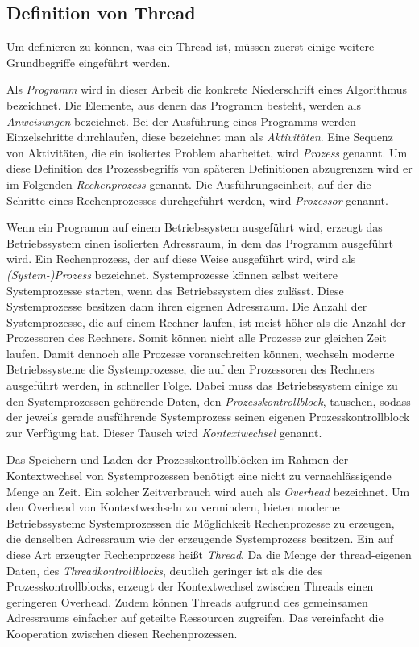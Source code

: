 

\subsection{Definition von Thread}
Um definieren zu können, was ein Thread ist, müssen zuerst einige weitere Grundbegriffe eingeführt werden. 

Als \emph{Programm} wird in dieser Arbeit die konkrete Niederschrift eines Algorithmus bezeichnet. Die Elemente, aus denen das Programm besteht, werden als \emph{Anweisungen} bezeichnet. Bei der Ausführung eines Programms werden Einzelschritte durchlaufen, diese bezeichnet man als \emph{Aktivitäten}. Eine Sequenz von Aktivitäten, die ein isoliertes Problem abarbeitet, wird \emph{Prozess} genannt. Um diese Definition des Prozessbegriffs von späteren Definitionen abzugrenzen wird er im Folgenden \emph{Rechenprozess} genannt. Die Ausführungseinheit, auf der die Schritte eines Rechenprozesses durchgeführt werden, wird \emph{Prozessor} genannt.\cite{Herrtwich1989}

Wenn ein Programm auf einem Betriebssystem ausgeführt wird, erzeugt das Betriebssystem einen isolierten Adressraum, in dem das Programm ausgeführt wird. Ein Rechenprozess, der auf diese Weise ausgeführt wird, wird als \emph{(System-)Prozess} bezeichnet. Systemprozesse können selbst weitere Systemprozesse starten, wenn das Betriebssystem dies zulässt. Diese Systemprozesse besitzen dann ihren eigenen Adressraum. Die Anzahl der Systemprozesse, die auf einem Rechner laufen, ist meist höher als die Anzahl der Prozessoren des Rechners. Somit können nicht alle Prozesse zur gleichen Zeit laufen. Damit dennoch alle Prozesse voranschreiten können, wechseln moderne Betriebssysteme die Systemprozesse, die auf den Prozessoren des Rechners ausgeführt werden, in schneller Folge. Dabei muss das Betriebssystem einige zu den Systemprozessen gehörende Daten, den \emph{Prozesskontrollblock}, tauschen, sodass der jeweils gerade ausführende Systemprozess seinen eigenen Prozesskontrollblock zur Verfügung hat. Dieser Tausch wird \emph{Kontextwechsel} genannt.\cite{Jobst2018}

Das Speichern und Laden der Prozesskontrollblöcken im Rahmen der Kontextwechsel von Systemprozessen benötigt eine nicht zu vernachlässigende Menge an Zeit. Ein solcher Zeitverbrauch wird auch als \emph{Overhead} bezeichnet. Um den Overhead von Kontextwechseln zu vermindern, bieten moderne Betriebssysteme Systemprozessen die Möglichkeit Rechenprozesse zu erzeugen, die denselben Adressraum wie der erzeugende Systemprozess besitzen. Ein auf diese Art erzeugter Rechenprozess heißt \emph{Thread}. Da die Menge der thread-eigenen Daten, des \emph{Threadkontrollblocks}, deutlich geringer ist als die des Prozesskontrollblocks, erzeugt der Kontextwechsel zwischen Threads einen geringeren Overhead. Zudem können Threads aufgrund des gemeinsamen Adressraums einfacher auf geteilte Ressourcen zugreifen. Das vereinfacht die Kooperation zwischen diesen Rechenprozessen.\cite{Jobst2018}


